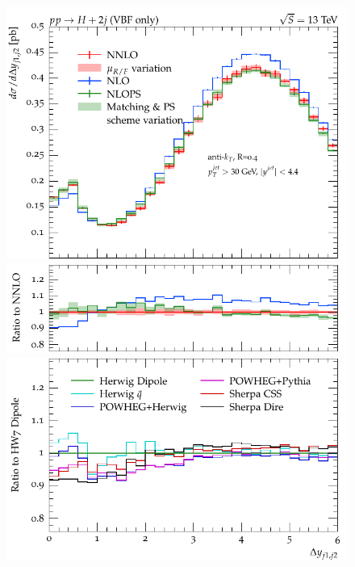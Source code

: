 \documentclass[10pt,prd,fleqn,superscriptaddress,notitlepage,nofootinbib,preprintnumbers,nobalancelastpage]{revtex4-1}
\begin{document}
\begin{figure}[tp]
  \centering
  \begin{minipage}{.32\textwidth}
    \includegraphics[width=\textwidth]{figures/tools/delta_y_jj12.pdf}
    \includegraphics[width=\textwidth]{figures/tools/delta_y_jj12_rFO.pdf}
    \includegraphics[width=\textwidth]{figures/tools/delta_y_jj12_rMC.pdf}
  \end{minipage}\hfill
  \begin{minipage}{.32\textwidth}

\end{minipage}
\end{figure}
\end{document}
